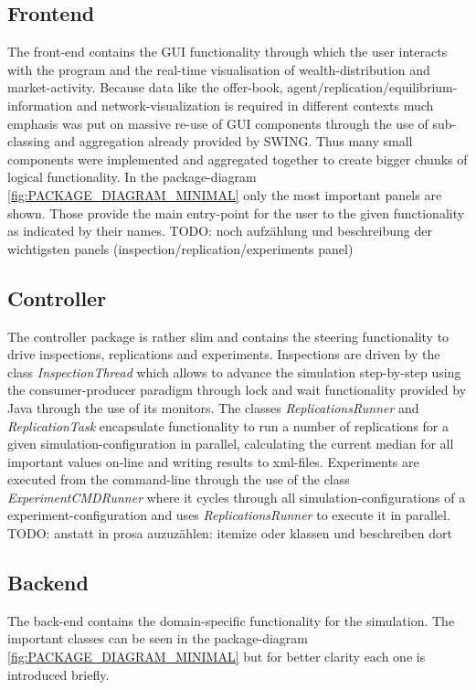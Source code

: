 \documentclass[Bachelorarbeit.tex]{subfiles}
\begin{document}
\subsection{Frontend}
The front-end contains the GUI functionality through which the user interacts with the program and the real-time visualisation of wealth-distribution and market-activity. Because data like the offer-book, agent/replication/equilibrium-information and network-visualization is required in different contexts much emphasis was put on massive re-use of GUI components through the use of sub-classing and aggregation already provided by SWING. Thus many small components were implemented and aggregated together to create bigger chunks of logical functionality. In the package-diagram \ref{fig:PACKAGE_DIAGRAM_MINIMAL} only the most important panels are shown. Those provide the main entry-point for the user to the given functionality as indicated by their names.
TODO: noch aufzählung und beschreibung der wichtigsten panels (inspection/replication/experiments panel)

\subsection{Controller}
The controller package is rather slim and contains the steering functionality to drive inspections, replications and experiments. Inspections are driven by the class \textit{InspectionThread} which allows to advance the simulation step-by-step using the consumer-producer paradigm through lock and wait functionality provided by Java through the use of its monitors. The classes \textit{ReplicationsRunner} and \textit{ReplicationTask} encapsulate functionality to run a number of replications for a given simulation-configuration in parallel, calculating the current median for all important values on-line and writing results to xml-files. Experiments are executed from the command-line through the use of the class \textit{ExperimentCMDRunner} where it cycles through all simulation-configurations of a experiment-configuration and uses \textit{ReplicationsRunner} to execute it in parallel. 
TODO: anstatt in prosa auzuzählen: itemize oder klassen und beschreiben dort

\subsection{Backend}
The back-end contains the domain-specific functionality for the simulation. The important classes can be seen in the package-diagram \ref{fig:PACKAGE_DIAGRAM_MINIMAL} but for better clarity each one is introduced briefly.
\end{document}
